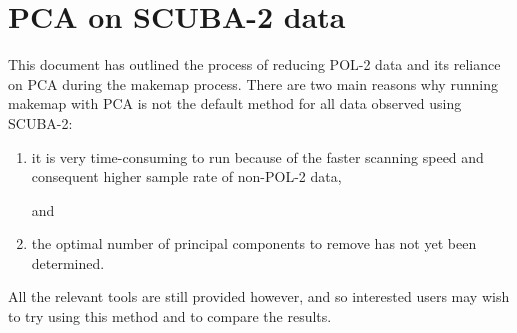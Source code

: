 \chapter{PCA on SCUBA-2 data}
\label{app:pca}

This document has outlined the process of reducing POL-2 data and its
reliance on PCA during the makemap process. There are two main reasons
why running makemap with PCA is not the default method for all data observed
using SCUBA-2:

\begin{enumerate}
\item it is very time-consuming to run because of the faster scanning speed
and consequent higher sample rate of non-POL-2 data,

and

\item the optimal number of principal components to remove has not yet been
determined.
\end{enumerate}

All the relevant tools are still provided however, and so interested users
may wish to try using this method and to compare the results.
